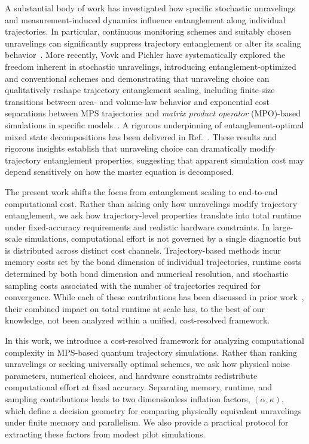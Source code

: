 \documentclass[aps, pra, superscriptaddress, reprint, floatfix]{revtex4-2}
\theoremstyle{plain}
\begin{document}
A substantial body of work has investigated how specific stochastic unravelings and measurement-induced dynamics influence entanglement along individual trajectories. In particular, continuous monitoring schemes and suitably chosen unravelings can significantly suppress trajectory entanglement or alter its scaling behavior~\cite{block_2022, liu_2024, cecile_2024, guimaraes_2023, leung_2024, kshetrimayum_2017}. More recently, Vovk and Pichler have systematically explored the freedom inherent in stochastic unravelings, introducing 
entanglement-optimized and conventional schemes and demonstrating that unraveling choice can qualitatively reshape trajectory entanglement scaling, including finite-size transitions between area- and volume-law behavior and exponential cost separations between MPS trajectories and \emph{matrix product operator} (MPO)-based simulations in specific models~\cite{vovk_2022, vovk_2024}.
A rigorous underpinning of entanglement-optimal mixed state decompositions has been delivered in Ref.\
\cite{SimonSimulation}. These results and rigorous insights establish that unraveling choice can dramatically modify trajectory entanglement properties, suggesting that apparent simulation cost may depend sensitively on how the master equation is decomposed.

The present work shifts the focus from entanglement scaling to end-to-end computational cost. Rather than asking only how unravelings modify trajectory entanglement, we ask how trajectory-level properties translate into total runtime under fixed-accuracy requirements and realistic hardware constraints. In large-scale simulations, computational effort is not governed by a single diagnostic but is distributed across distinct cost channels. Trajectory-based methods incur memory costs set by the bond dimension of individual trajectories, runtime costs determined by both bond dimension and numerical resolution, and stochastic sampling costs associated with the number of trajectories required for convergence. While each of these contributions has been discussed in prior work~\cite{daley_2014, transchel_2014, weimer_2021, moroder_2023,SimonSimulation}, their combined impact on total runtime at scale has, to the best of our knowledge, not been analyzed within a unified, cost-resolved framework.

In this work, we introduce a cost-resolved framework for analyzing computational complexity in MPS-based quantum trajectory simulations. Rather than ranking unravelings or seeking universally optimal schemes, we ask how physical noise parameters, numerical choices, and hardware constraints redistribute computational effort at fixed accuracy. Separating memory, runtime, and sampling contributions leads to two dimensionless inflation factors, $(\alpha,\kappa)$, which define a decision geometry for comparing physically equivalent unravelings under finite memory and parallelism. We also provide a practical protocol for extracting these factors from modest pilot simulations.
\end{document}

